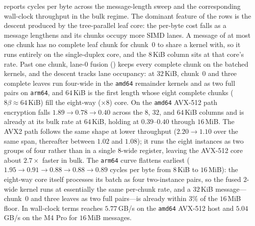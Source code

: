  reports cycles per byte across the message-length sweep and
 the corresponding wall-clock throughput in the bulk
regime. The dominant feature of the \TW{} rows is the descent produced by the
tree-parallel leaf core: the per-byte cost falls as a message lengthens and its
chunks occupy more SIMD lanes. A message of at most one chunk has no complete
leaf chunk for chunk~$0$ to share a kernel with, so it runs entirely on the
single-duplex core, and the $8$\,KiB column sits at that core's rate. Past one
chunk, lane-$0$ fusion () keeps every complete chunk on the
batched kernels, and the descent tracks lane occupancy: at $32$\,KiB, chunk~$0$
and three complete leaves run four-wide in the \texttt{amd64} remainder kernels
and as two full pairs on \texttt{arm64}, and $64$\,KiB is the first length
whose eight complete chunks ($8\beta \approx 64$\,KiB) fill the eight-way
($\times 8$) core. On the \texttt{amd64} AVX-512 path \TW{} encryption falls
$1.89 \to 0.78 \to 0.40$ across the $8$, $32$, and $64$\,KiB columns and is
already at its bulk rate at $64$\,KiB, holding at $0.39$--$0.40$ through
$16$\,MiB. The AVX2 path follows the same shape at lower throughput ($2.20 \to
1.10$ over the same span, thereafter between $1.02$ and $1.08$); it runs the
eight instances as two groups of four rather than in a single $8$-wide
register, leaving the AVX-512 core about $2.7\times$ faster in bulk. The
\texttt{arm64} curve flattens earliest ($1.95 \to 0.91 \to 0.88 \to 0.88 \to
0.89$ cycles per byte from $8$\,KiB to $16$\,MiB): the eight-way core itself
processes its batch as four two-instance pairs, so the fused $2$-wide kernel
runs at essentially the same per-chunk rate, and a $32$\,KiB message---chunk~$0$
and three leaves as two full pairs---is already within $3\%$ of the $16$\,MiB
floor. In wall-clock terms \TW{} reaches $5.77$\,GB/s on the \texttt{amd64}
AVX-512 host and $5.04$\,GB/s on the M4 Pro for $16$\,MiB messages.

